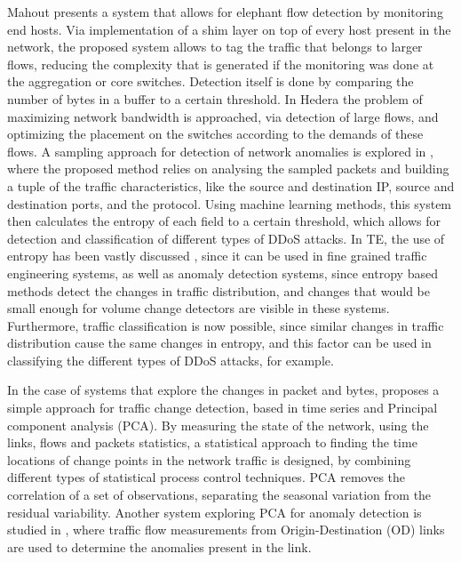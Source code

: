 \par Mahout \cite{curtis_mahout:_2011} presents a system that allows for elephant flow detection by monitoring end hosts. Via implementation of a shim layer on top
of every host present in the network, the proposed system allows to tag the traffic that belongs to larger flows, reducing the complexity that is generated 
if the monitoring was done at the aggregation or core switches. Detection itself is done by comparing the number of bytes in a buffer to a certain threshold.
In Hedera \cite{al-fares_hedera:_2010} the problem of maximizing network bandwidth is approached, via detection of large flows, and optimizing the placement on the switches
according to the demands of these flows. A sampling approach for detection of network anomalies is explored in \cite{jun_ddos_2014}, where the 
proposed method relies on analysing the sampled packets and building a tuple of the traffic characteristics, like the source and destination IP, source and 
destination ports, and the protocol. Using machine learning methods, this system then calculates the entropy of each field to a certain threshold, which
allows for detection and classification of different types of DDoS attacks. In TE, the use of entropy has been vastly discussed \cite{brauckhoff_impact_2006,
lall_data_2006}, since it can be used in fine grained traffic engineering systems, as well as anomaly detection systems, since entropy based methods
detect the changes in traffic distribution, and changes that would be small enough for volume change detectors are visible in these systems. Furthermore, traffic
classification is now possible, since similar changes in traffic distribution cause the same changes in entropy, and this factor can be used in classifying the 
different types of DDoS attacks, for example.

\par In the case of systems that explore the changes in packet and bytes, \cite{munz_traffic_2010} proposes a simple approach
for traffic change detection, based in time series and Principal component analysis (PCA). By measuring the state of the network, using the links, flows and packets
statistics, a statistical approach to finding the time locations of change points in the network traffic is designed, by combining different types of statistical
process control techniques.
PCA removes the correlation of a set of observations, separating the seasonal variation from the residual variability. Another system exploring PCA for anomaly
detection is studied in \cite{lakhina_characterization_2004}, where traffic flow measurements from Origin-Destination (OD) links are used to determine the anomalies
present in the link. 

